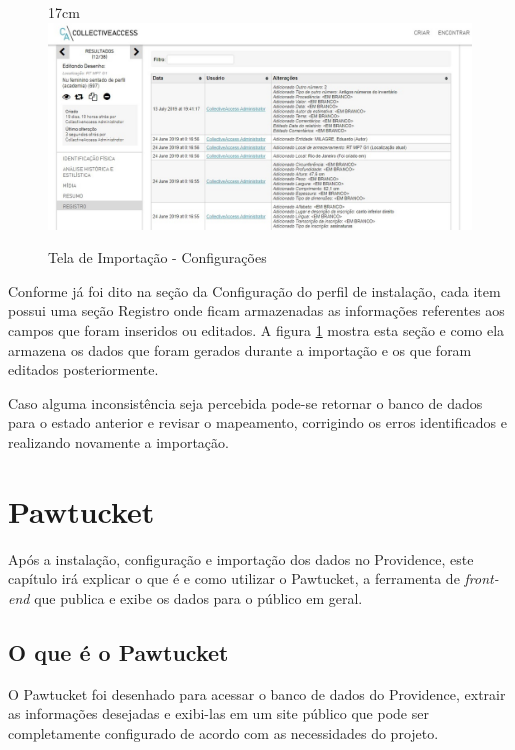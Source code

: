 \documentclass[a4paper,12pt,oneside,onecolumn,final,fleqn]{repUERJ}
\begin{document}
\begin{figure}[!ht]{17cm}
	\includegraphics[width=15cm, left]{figuras/tela_reg.jpg}
	\caption{Tela de Importação - Configurações} \label{fig:tela_reg}
\end{figure}

Conforme já foi dito na seção da Configuração do perfil de instalação, cada item possui uma seção Registro onde ficam armazenadas as informações referentes aos campos que foram inseridos ou editados. A figura \ref{fig:tela_reg} mostra esta seção e como ela armazena os dados que foram gerados durante a importação e os que foram editados posteriormente.

Caso alguma inconsistência seja percebida pode-se retornar o banco de dados para o estado anterior e revisar o mapeamento, corrigindo os erros identificados e realizando novamente a importação.

\chapter{Pawtucket}

Após a instalação, configuração e importação dos dados no Providence, este capítulo irá explicar o que é e como utilizar o Pawtucket, a ferramenta de \textit{front-end} que publica e exibe os dados para o público em geral.

\section{O que é o Pawtucket}

O Pawtucket foi desenhado para acessar o banco de dados do Providence, extrair as informações desejadas e exibi-las em um site público que pode ser completamente configurado de acordo com as necessidades do projeto. 
\end{document}
